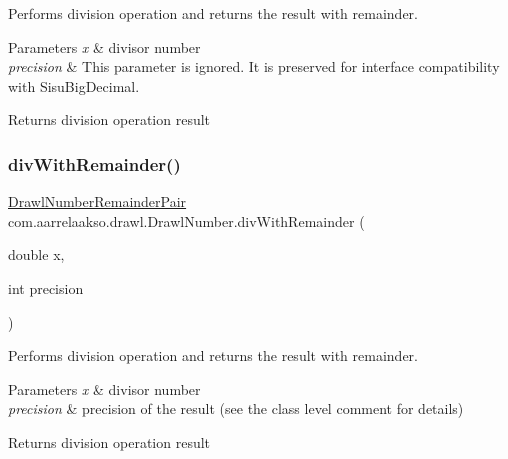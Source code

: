 Performs division operation and returns the result with remainder. 


\begin{DoxyParams}{Parameters}
{\em x} & divisor number \\
\hline
{\em precision} & This parameter is ignored. It is preserved for interface compatibility with Sisu\+Big\+Decimal. \\
\hline
\end{DoxyParams}
\begin{DoxyReturn}{Returns}
division operation result 
\end{DoxyReturn}
\mbox{\label{classcom_1_1aarrelaakso_1_1drawl_1_1_drawl_number_a99090eea8ac1be98cf40ef75f8eed090}} 
\subsubsection{\texorpdfstring{div\+With\+Remainder()}{divWithRemainder()}\hspace{0.1cm}{\footnotesize\ttfamily [2/2]}}
{\footnotesize\ttfamily \hyperlink{classcom_1_1aarrelaakso_1_1drawl_1_1_drawl_number_remainder_pair}{Drawl\+Number\+Remainder\+Pair} com.\+aarrelaakso.\+drawl.\+Drawl\+Number.\+div\+With\+Remainder (\begin{DoxyParamCaption}\item[{double}]{x,  }\item[{int}]{precision }\end{DoxyParamCaption})\hspace{0.3cm}{\ttfamily [protected]}}



Performs division operation and returns the result with remainder. 


\begin{DoxyParams}{Parameters}
{\em x} & divisor number \\
\hline
{\em precision} & precision of the result (see the class level comment for details) \\
\hline
\end{DoxyParams}
\begin{DoxyReturn}{Returns}
division operation result 
\end{DoxyReturn}
\mbox{\label{classcom_1_1aarrelaakso_1_1drawl_1_1_drawl_number_af5e6d77e51e7b6167d18acec2eb26877}} 
